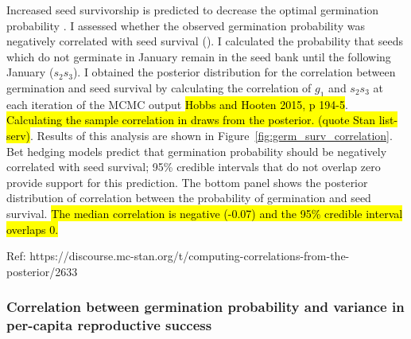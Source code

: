 \documentclass[12pt, oneside, titlepage]{article}   	%
\begin{document}
Increased seed survivorship is predicted to decrease the optimal germination probability \cite{cohen1966,ellner1985a}. I assessed whether the observed germination probability was negatively correlated with seed survival (\cite{gremer2014}). I calculated the probability that seeds which do not germinate in January remain in the seed bank until the following January ($s_2 s_3$). I obtained the posterior distribution for the correlation between germination and seed survival by calculating the correlation of $g_1$ and $s_2 s_3$ at each iteration of the MCMC output \hl{Hobbs and Hooten 2015, p 194-5}. \hl{Calculating the sample correlation in draws from the posterior. (quote Stan list-serv)}. Results of this analysis are shown in Figure~\ref{fig:germ_surv_correlation}. Bet hedging models predict that germination probability should be negatively correlated with seed survival; 95\% credible intervals that do not overlap zero provide support for this prediction. The bottom panel shows the posterior distribution of correlation between the probability of germination and seed survival. \hl{The median correlation is negative (-0.07) and the 95\% credible interval overlaps 0.}

Ref: https://discourse.mc-stan.org/t/computing-correlations-from-the-posterior/2633

\subsubsection*{Correlation between germination probability and variance in per-capita reproductive success}
\end{document}

